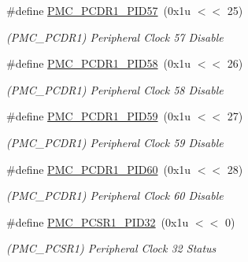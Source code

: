 \begin{DoxyCompactItemize}
\mbox{\label{group__SAME70__PMC_ga3397f5f77ce2e10aab46be29842bc052}} 
\#define \mbox{\hyperlink{group__SAME70__PMC_ga3397f5f77ce2e10aab46be29842bc052}{P\+M\+C\+\_\+\+P\+C\+D\+R1\+\_\+\+P\+I\+D57}}~(0x1u $<$$<$ 25)
\begin{DoxyCompactList}\small\item\em (P\+M\+C\+\_\+\+P\+C\+D\+R1) Peripheral Clock 57 Disable \end{DoxyCompactList}\item 
\mbox{\label{group__SAME70__PMC_ga00743b75a6a146d4f3fbec30e4b02d25}} 
\#define \mbox{\hyperlink{group__SAME70__PMC_ga00743b75a6a146d4f3fbec30e4b02d25}{P\+M\+C\+\_\+\+P\+C\+D\+R1\+\_\+\+P\+I\+D58}}~(0x1u $<$$<$ 26)
\begin{DoxyCompactList}\small\item\em (P\+M\+C\+\_\+\+P\+C\+D\+R1) Peripheral Clock 58 Disable \end{DoxyCompactList}\item 
\mbox{\label{group__SAME70__PMC_ga644853bb7606a41cfa75dabbddd0b322}} 
\#define \mbox{\hyperlink{group__SAME70__PMC_ga644853bb7606a41cfa75dabbddd0b322}{P\+M\+C\+\_\+\+P\+C\+D\+R1\+\_\+\+P\+I\+D59}}~(0x1u $<$$<$ 27)
\begin{DoxyCompactList}\small\item\em (P\+M\+C\+\_\+\+P\+C\+D\+R1) Peripheral Clock 59 Disable \end{DoxyCompactList}\item 
\mbox{\label{group__SAME70__PMC_gae56a89ab61dd2b17093818fb910ae4cb}} 
\#define \mbox{\hyperlink{group__SAME70__PMC_gae56a89ab61dd2b17093818fb910ae4cb}{P\+M\+C\+\_\+\+P\+C\+D\+R1\+\_\+\+P\+I\+D60}}~(0x1u $<$$<$ 28)
\begin{DoxyCompactList}\small\item\em (P\+M\+C\+\_\+\+P\+C\+D\+R1) Peripheral Clock 60 Disable \end{DoxyCompactList}\item 
\mbox{\label{group__SAME70__PMC_gac91dd4748028ff9dad647ff84b3acbbc}} 
\#define \mbox{\hyperlink{group__SAME70__PMC_gac91dd4748028ff9dad647ff84b3acbbc}{P\+M\+C\+\_\+\+P\+C\+S\+R1\+\_\+\+P\+I\+D32}}~(0x1u $<$$<$ 0)
\begin{DoxyCompactList}\small\item\em (P\+M\+C\+\_\+\+P\+C\+S\+R1) Peripheral Clock 32 Status \end{DoxyCompactList}\item 
$$
\end{DoxyCompactItemize}
